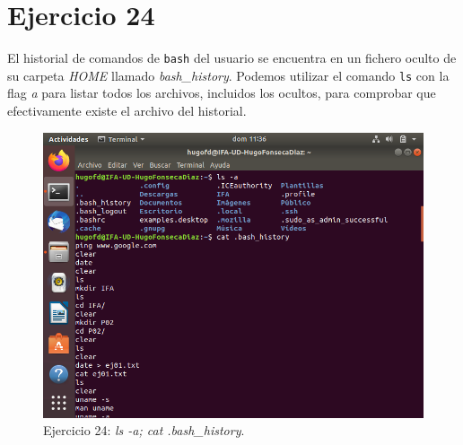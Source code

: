 \documentclass[11pt]{article}
\begin{document}
\section{Ejercicio 24}
El historial de comandos de \verb|bash| del usuario se encuentra en un fichero oculto de su carpeta \textit{HOME} llamado \textit{bash\_history}. Podemos utilizar el comando \verb|ls| con la flag \textit{a} para listar todos los archivos, incluidos los ocultos, para comprobar que efectivamente existe el archivo del historial.

\begin{figure}[H]
    \caption{Ejercicio 24: \textit{ls -a; cat .bash\_history}.}
  \centering
  \includegraphics{e24.png}
\end{figure}

\begin{thebibliography}{8}
\end{thebibliography}
\end{document}
